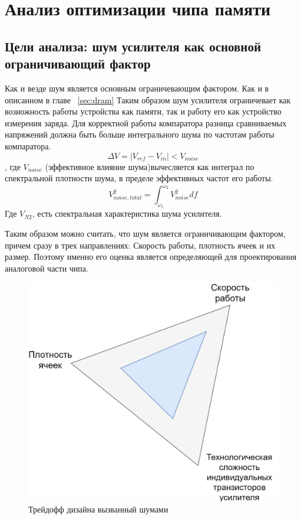 \documentclass[a4paper,12pt]{article} %
\begin{document}
\section{Анализ оптимизации чипа памяти}
\label{sec:analisis}
\subsection{Цели анализа: шум усилителя как основной ограничивающий фактор}
\label{sec:noise}
Как и везде шум является основным ограничевающим фактором. Как и в описанном в главе ~\ref{sec:dram}
Таким образом шум усилителя ограничевает как возиожность работы устройства как памяти, так и работу его как устройство измерения заряда. Для корректной работы компаратора разница сравниваемых напряжений должна быть больше интегрального шума по частотам работы компаратора. 
$$ \Delta V = |V_{ref} - V_{in}| < V_{noise}  $$
, где $V_{noise}$ (эффективное влияние шума)вычесляется как интеграл по спектральной плотности шума, в пределе эффективных частот его работы.
$$ V_{noise,total}^2 = \int_{\omega_1}^{\omega_2} V_{noise}^2df   $$
Где $V_{N2}$, есть спектральная характеристика шума усилителя.

Таким образом можно считать, что шум является ограничивающим фактором, причем сразу в трех направлениях: Скорость работы, плотность ячеек и их размер. Поэтому именно его оценка является определяющей для проектирования аналоговой части чипа. 



\begin{figure}[H]
  \begin{center}
    \includegraphics[width=0.6\linewidth]{FRAM-6.png}
  \end{center}
  \caption{Трейдофф дизайна вызванный шумами }
  \label{FRAM_fig6}
\end{figure}
\end{document}
